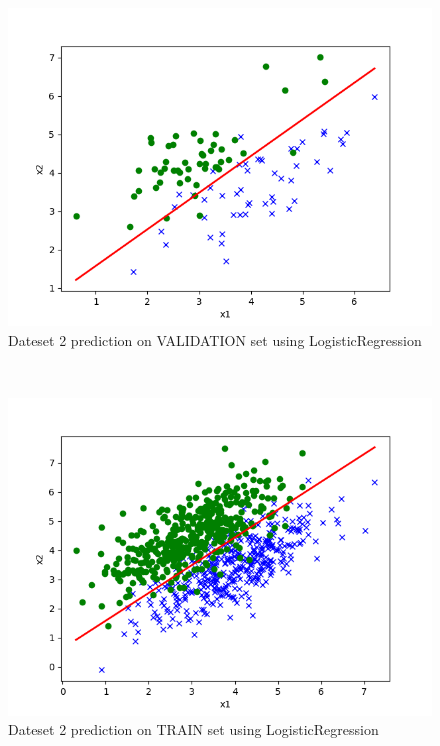 \begin{answer}
\begin{figure}
  \includegraphics[width=\linewidth]{../src/output/p01b_pred_2_eval.png}
  \caption{Dateset 2 prediction on VALIDATION set using LogisticRegression}
  \label{fig:Dateset 2 prediction on VALIDATION set using LogisticRegression}
\end{figure}\\
\begin{figure}
  \includegraphics[width=\linewidth]{../src/output/p01b_pred_2_train.png}
  \caption{Dateset 2 prediction on TRAIN set using LogisticRegression}
  \label{fig:Dateset 2 prediction on TRAIN set using LogisticRegression}
\end{figure}\\

\end{answer}
